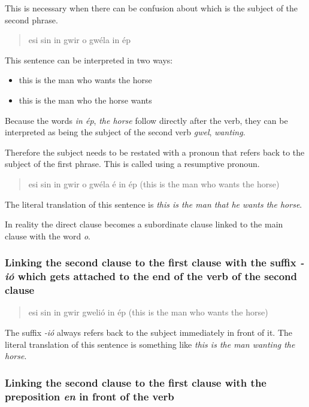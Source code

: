 This is necessary when there can be confusion about which is the subject of the second phrase.

\begin{quote}
esi sin in gwir o gw\'{e}la in \'{e}p
\end{quote}

This sentence can be interpreted in two ways:
\begin{itemize}
    \item this is the man who wants the horse
    \item this is the man who the horse wants
\end{itemize}

Because the words \textit{in \'{e}p}, \textit{the horse} follow directly after the verb, they can be interpreted as being the subject of the second verb \textit{gwel}, \textit{wanting}.

Therefore the subject needs to be restated with a pronoun that refers back to the subject of the first phrase. This is called using a resumptive pronoun.

\begin{quote}
esi sin in gwir o gw\'{e}la \'{e} in \'{e}p (this is the man who wants the horse)
\end{quote}

The literal translation of this sentence is \textit{this is the man that he wants the horse}.

In reality the direct clause becomes a subordinate clause linked to the main clause with the word \textit{o}.

\subsubsection{Linking the second clause to the first clause with the suffix \textit{-i\'{o}} which gets attached to the end of the verb of the second clause}

\begin{quote}
esi sin in gwir gweli\'{o} in \'{e}p (this is the man who wants the horse)
\end{quote}

The suffix \textit{-i\'{o}} always refers back to the subject immediately in front of it. The literal translation of this sentence is something like \textit{this is the man wanting the horse}.

\subsubsection{Linking the second clause to the first clause with the preposition \textit{en} in front of the verb}

